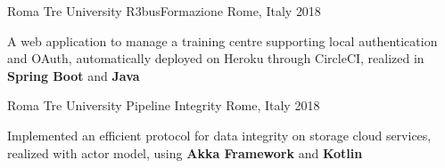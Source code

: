 

\begin{cventries}

  \cventry
    {Roma Tre University} %
    {R3busFormazione} %
    {Rome, Italy} %
    {2018} %
    {
      \begin{cvitems} %
        \item {A web application to manage a training centre supporting local authentication and OAuth, automatically deployed on Heroku through CircleCI, realized in \textbf{Spring Boot} and \textbf{Java}}
      \end{cvitems}
    }

  \cventry
    {Roma Tre University} %
    {Pipeline Integrity} %
    {Rome, Italy} %
    {2018} %
    {
      \begin{cvitems} %
        \item {Implemented an efficient protocol for data integrity on storage cloud services, realized with actor model, using \textbf{Akka Framework} and \textbf{Kotlin}}
      \end{cvitems}
    }

\end{cventries}
